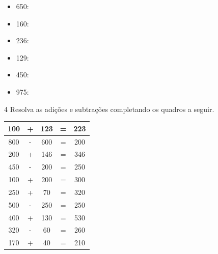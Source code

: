 \begin{itemize}
\item 650: 

\item 160: 

\item 236: 

\item 129: 

\item 450: 

\item 975: 

\end{itemize}

\num{4} Resolva as adições e subtrações completando os quadros a seguir.

\begin{table}[H]
\centering
\begin{tabular}{|c|c|c|c|c|}
\hline
100 & + & 123 & = & {\color[HTML]{EB3597} 223} \\ \hline
800 & - & 600 & = & {\color[HTML]{EB3597} 200} \\ \hline
200 & + & 146 & = & {\color[HTML]{EB3597} 346} \\ \hline
450 & - & 200 & = & {\color[HTML]{EB3597} 250} \\ \hline
100 & + & 200 & = & {\color[HTML]{EB3597} 300} \\ \hline
250 & + & 70  & = & {\color[HTML]{EB3597} 320} \\ \hline
500 & - & 250 & = & {\color[HTML]{EB3597} 250} \\ \hline
400 & + & 130 & = & {\color[HTML]{EB3597} 530} \\ \hline
320 & - & 60  & = & {\color[HTML]{EB3597} 260} \\ \hline
170 & + & 40  & = & {\color[HTML]{EB3597} 210} \\ \hline
\end{tabular}
\end{table}


